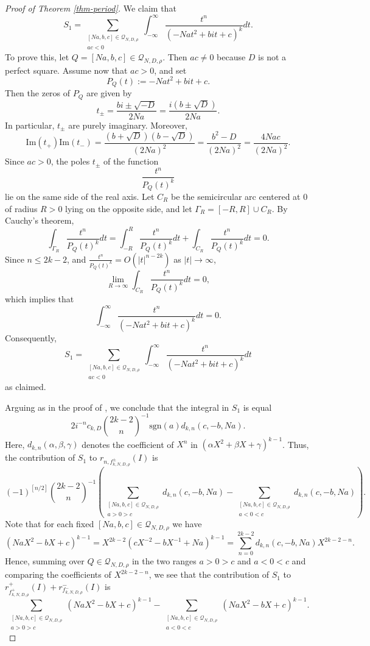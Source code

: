 \documentclass[12pt]{amsart}
\numberwithin{equation}{section}
\theoremstyle{definition}
\begin{document}
\begin{proof}[Proof of Theorem \ref{thm-period}]
We claim that
$$S_{1}=\sum\limits_{\substack{[Na,b,c]\in\mathcal{Q}_{N,D,\rho} \\ ac<0}}\int_{-\infty}^{\infty}\frac{t^{n}}{(-Nat^{2}+bit+c)^{k}}dt.$$
To prove this, let $Q=[Na,b,c]\in\mathcal{Q}_{N,D,\rho}$. Then $ac\neq 0$ because $D$ is not a perfect square. Assume now that $ac>0$, and set
$$P_{Q}(t):=-Nat^{2}+bit+c.$$
Then the zeros of $P_{Q}$ are given by
$$t_{\pm}=\frac{bi\pm\sqrt{-D}}{2Na}=\frac{i(b\pm\sqrt{D})}{2Na}.$$
In particular, $t_{\pm}$ are purely imaginary.
Moreover,
$$\mathrm{Im}(t_{+})\mathrm{Im}(t_{-})
=\frac{(b+\sqrt{D})(b-\sqrt{D})}{(2Na)^{2}}
=\frac{b^{2}-D}{(2Na)^{2}}
=\frac{4Nac}{(2Na)^{2}}.$$
Since $ac>0$, the poles $t_{\pm}$ of the function
$$\frac{t^{n}}{P_{Q}(t)^{k}}$$
lie on the same side of the real axis.
Let $C_{R}$ be the semicircular arc centered at $0$ of radius $R>0$ lying on the opposite side, and let $\Gamma_R=[-R,R]\cup C_{R}$.
By Cauchy's theorem,
$$\int_{\Gamma_{R}}\frac{t^{n}}{P_{Q}(t)^{k}}dt=\int_{-R}^{R}\frac{t^{n}}{P_{Q}(t)^{k}}dt+\int_{C_{R}}\frac{t^{n}}{P_{Q}(t)^{k}}dt=0.$$
Since $n\leq 2k-2$, and $\frac{t^{n}}{P_{Q}(t)^{k}}=O(|t|^{n-2k})$ as $|t|\rightarrow \infty$,
$$\lim_{R\rightarrow\infty}\int_{C_{R}}\frac{t^{n}}{P_{Q}(t)^{k}}dt=0,$$
which implies that
$$\int_{-\infty}^{\infty}\frac{t^{n}}{(-Nat^{2}+bit+c)^{k}}dt=0.$$
Consequently,
$$S_{1}=\sum_{\substack{[Na,b,c]\in\mathcal{Q}_{N,D,\rho}\\ ac<0}}
\int_{-\infty}^{\infty}\frac{t^{n}}{(-Nat^{2}+bit+c)^{k}}dt$$
as claimed.

Arguing as in the proof of \cite[Theorem 5]{KZ84}, we conclude that the integral in $S_{1}$ is equal
$$2i^{-n}c_{k,D}\binom{2k-2}{n}^{-1}\mathrm{sgn}(a)d_{k,n}(c,-b,Na).$$
Here, $d_{k,n}(\alpha,\beta,\gamma)$ denotes the coefficient of $X^{n}$ in $(\alpha X^{2}+\beta X+\gamma)^{k-1}$.
Thus, the contribution of $S_{1}$ to $r_{n,f_{k,N,D,\rho}^{\pm}}(I)$ is
$$(-1)^{[n/2]}\binom{2k-2}{n}^{-1}\left(\sum\limits_{\substack{[Na,b,c]\in\mathcal{Q}_{N,D,\rho} \\ a>0>c}}d_{k,n}(c,-b,Na)-\sum\limits_{\substack{[Na,b,c]\in\mathcal{Q}_{N,D,\rho} \\ a<0<c}}d_{k,n}(c,-b,Na)\right).$$
Note that for each fixed $[Na,b,c]\in\mathcal{Q}_{N,D,\rho}$ we have
$$(NaX^{2}-bX+c)^{k-1}=X^{2k-2}(cX^{-2}-bX^{-1}+Na)^{k-1}=\sum_{n=0}^{2k-2}d_{k,n}(c,-b,Na)X^{2k-2-n}.$$
Hence, summing over $Q\in\mathcal{Q}_{N,D,\rho}$ in the two ranges $a>0>c$ and $a<0<c$ and comparing the coefficients of $X^{2k-2-n}$, we see that the contribution of $S_{1}$ to
$r_{f_{k,N,D,\rho}^{+}}^{+}(I)+r_{f_{k,N,D,\rho}^{-}}^{-}(I)$ is
$$\sum\limits_{\substack{[Na,b,c]\in\mathcal{Q}_{N,D,\rho} \\ a>0>c}}(NaX^{2}-bX+c)^{k-1}-\sum\limits_{\substack{[Na,b,c]\in\mathcal{Q}_{N,D,\rho} \\ a<0<c}}(NaX^{2}-bX+c)^{k-1}.$$


\end{proof}
\end{document}
